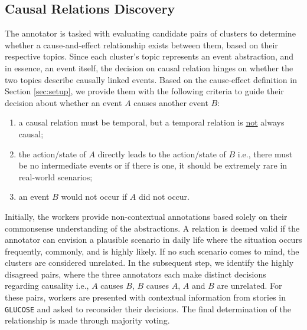 \subsection{Causal Relations Discovery}\label{sup:annotation_ph2}
The annotator is tasked with evaluating candidate pairs of clusters to determine whether a cause-and-effect relationship exists between them, based on their respective topics. Since each cluster's topic represents an event abstraction, and in essence, an event itself, the decision on causal relation hinges on whether the two topics describe causally linked events. Based on the cause-effect definition in Section \ref{sec:setup}, we provide them with the following criteria to guide their decision about whether an event $A$ causes another event $B$:
\begin{enumerate}[leftmargin=5.5mm]
    \item a causal relation must be temporal, but a temporal relation is \underline{not} always causal;

    \item the action/state of $A$ directly leads to the action/state of $B$ i.e., there must be no intermediate events or if there is one, it should be extremely rare in real-world scenarios;
    
    \item an event $B$ would not occur if $A$ did not occur.
\end{enumerate}

Initially, the workers provide non-contextual annotations based solely on their commonsense understanding of the abstractions. A relation is deemed valid if the annotator can envision a plausible scenario in daily life where the situation occurs frequently, commonly, and is highly likely. If no such scenario comes to mind, the clusters are considered unrelated. In the subsequent step, we identify the highly disagreed pairs, where the three annotators each make distinct decisions regarding causality i.e., $A$ causes $B$, $B$ causes $A$, $A$ and $B$ are unrelated. For these pairs, workers are presented with contextual information from stories in \texttt{GLUCOSE} and asked to reconsider their decisions. The final determination of the relationship is made through majority voting.

